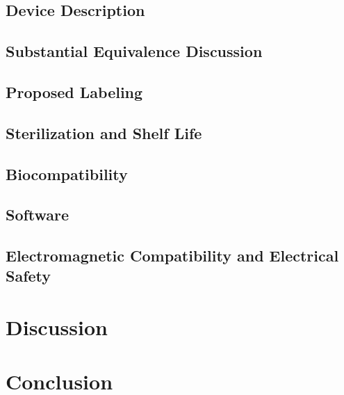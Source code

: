 \documentclass{article}
\begin{document}
\subsection{Device Description}
\subsection{Substantial Equivalence Discussion}
\subsection{Proposed Labeling}
\subsection{Sterilization and Shelf Life}
\subsection{Biocompatibility}
\subsection{Software}
\subsection{Electromagnetic Compatibility and Electrical Safety}

\section{Discussion}
\label{sec:discussion}

\section{Conclusion}
\label{sec:conclusion}


\newpage
{}


\end{document}
